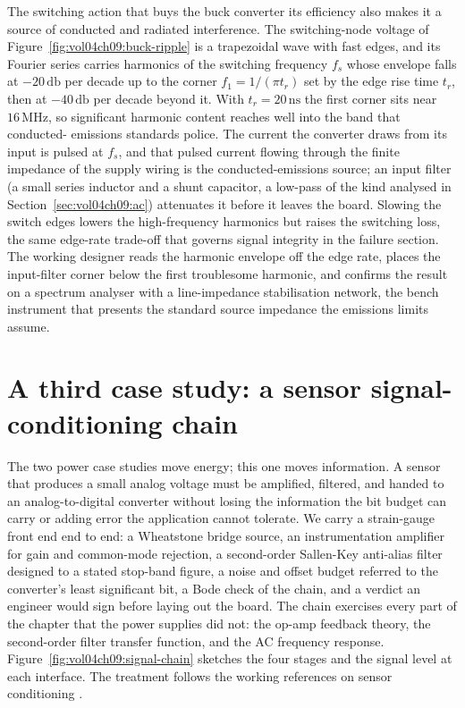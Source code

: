 \begin{mastery}
The switching action that buys the buck converter its efficiency also makes
it a source of conducted and radiated interference. The switching-node
voltage of Figure~\ref{fig:vol04ch09:buck-ripple} is a trapezoidal wave with
fast edges, and its Fourier series carries harmonics of the switching
frequency $f_{s}$ whose envelope falls at $-20\,\si{\decibel}$ per decade up
to the corner $f_{1} = 1/(\pi t_{r})$ set by the edge rise time $t_{r}$,
then at $-40\,\si{\decibel}$ per decade beyond it. With $t_{r} = 20\,\si{
\nano\second}$ the first corner sits near $16\,\si{\mega\hertz}$, so
significant harmonic content reaches well into the band that conducted-
emissions standards police. The current the converter draws from its input
is pulsed at $f_{s}$, and that pulsed current flowing through the finite
impedance of the supply wiring is the conducted-emissions source; an input
filter (a small series inductor and a shunt capacitor, a low-pass of the
kind analysed in Section~\ref{sec:vol04ch09:ac}) attenuates it before it
leaves the board. Slowing the switch edges lowers the high-frequency
harmonics but raises the switching loss, the same edge-rate trade-off that
governs signal integrity in the failure section. The working designer reads
the harmonic envelope off the edge rate, places the input-filter corner
below the first troublesome harmonic, and confirms the result on a spectrum
analyser with a line-impedance stabilisation network, the bench instrument
that presents the standard source impedance the emissions limits assume.
\end{mastery}

\section{A third case study: a sensor signal-conditioning chain}
\label{sec:vol04ch09:signal-chain-case}

The two power case studies move energy; this one moves information. A
sensor that produces a small analog voltage must be amplified, filtered,
and handed to an analog-to-digital converter without losing the
information the bit budget can carry or adding error the application
cannot tolerate. We carry a strain-gauge front end end to end: a
Wheatstone bridge source, an instrumentation amplifier for gain and
common-mode rejection, a second-order Sallen-Key anti-alias filter
designed to a stated stop-band figure, a noise and offset budget
referred to the converter's least significant bit, a Bode check of the
chain, and a verdict an engineer would sign before laying out the board.
The chain exercises every part of the chapter that the power supplies did
not: the op-amp feedback theory, the second-order filter transfer
function, and the AC frequency response.
Figure~\ref{fig:vol04ch09:signal-chain} sketches the four stages and the
signal level at each interface. The treatment follows the working
references on sensor conditioning
\cite{text:ch05-pallas-areny-webster2001, text:ch05-northrop2014}.

